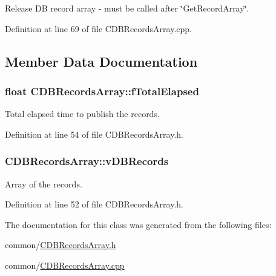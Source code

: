 \-Release \-D\-B record array -\/ must be called after \char`\"{}\-Get\-Record\-Array\char`\"{}. 



\-Definition at line 69 of file \-C\-D\-B\-Records\-Array.\-cpp.



\subsection{\-Member \-Data \-Documentation}
\hypertarget{class_c_d_b_records_array_aa64819ed7441e3e28fc6cf13e42713d0}{
\subsubsection[{f\-Total\-Elapsed}]{\setlength{\rightskip}{0pt plus 5cm}float {\bf \-C\-D\-B\-Records\-Array\-::f\-Total\-Elapsed}}}\label{class_c_d_b_records_array_aa64819ed7441e3e28fc6cf13e42713d0}


\-Total elapsed time to publish the records. 



\-Definition at line 54 of file \-C\-D\-B\-Records\-Array.\-h.

\hypertarget{class_c_d_b_records_array_a5f29315f1b26188a7b53790b4d65dfda}{
\subsubsection[{v\-D\-B\-Records}]{ {\bf \-C\-D\-B\-Records\-Array\-::v\-D\-B\-Records}}}\label{class_c_d_b_records_array_a5f29315f1b26188a7b53790b4d65dfda}


\-Array of the records. 



\-Definition at line 52 of file \-C\-D\-B\-Records\-Array.\-h.



\-The documentation for this class was generated from the following files\-:\begin{DoxyCompactItemize}
\item 
common/\hyperlink{_c_d_b_records_array_8h}{\-C\-D\-B\-Records\-Array.\-h}\item 
common/\hyperlink{_c_d_b_records_array_8cpp}{\-C\-D\-B\-Records\-Array.\-cpp}\end{DoxyCompactItemize}
